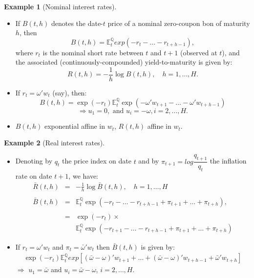 \documentclass[
  12pt,
]{book}
\providecommand{\tightlist}{%
  \setlength{\itemsep}{0pt}\setlength{\parskip}{0pt}}
\theoremstyle{definition}
\theoremstyle{definition}
\newtheorem{example}{Example}[chapter]
\theoremstyle{definition}
\theoremstyle{definition}
\theoremstyle{remark}
\begin{document}
\begin{example}[Nominal interest rates]
\protect\hypertarget{exm:nominalBth}{}\label{exm:nominalBth}\leavevmode

\begin{itemize}
\tightlist
\item
  If \(B(t,h)\) denotes the date-\(t\) price of a nominal zero-coupon bon of maturity \(h\), then
  \begin{equation}
  B(t,h) = \mathbb{E}^{\mathbb{Q}}_t exp (-r_{t}-\dots-r_{t+h-1}),\label{eq:stdbond}
  \end{equation}
  where \(r_{t}\) is the nominal short rate between \(t\) and \(t+1\) (observed at \(t\)), and the associated (continuously-compounded) yield-to-maturity is given by:
  \begin{equation}
  R(t,h) = -  \frac{1}{h}   \log   B(t,h), \quad   h=1,\dots,H.
  \end{equation}
\item
  If \(r_t = \omega'w_t\) (say), then:
  \[
  B(t,h) = \exp(-r_{t}) \mathbb{E}^{\mathbb{Q}}_t \exp(-\omega' w_{t+1} - \dots - \omega' w_{t+h-1})
  \]
  \[
  \Rightarrow u_1 = 0,\mbox{ and } u_i = - \omega, i = 2,\dots, H.
  \]
\item
  \(B(t,h)\) exponential affine in \(w_t\), \(R(t,h)\) affine in \(w_t\).
\end{itemize}

\end{example}

\begin{example}[Real interest rates]
\protect\hypertarget{exm:realBth}{}\label{exm:realBth}\leavevmode

\begin{itemize}
\tightlist
\item
  Denoting by \(q_t\) the price index on date \(t\) and by \(\pi_{t+1} = log \dfrac{q_{t+1}}{q_t}\) the inflation rate on date \(t+1\), we have:
  \begin{eqnarray*}
  \bar{R}(t,h) & =& -   \frac{1}{h}   \log   \bar{B}(t,h), \quad h=1,\dots,H \\    \\
  \bar{B}(t,h) & =&  \mathbb{E}^{\mathbb{Q}}_t   \exp(-r_{t}-\dots-r_{t+h-1} + \pi_{t+1}+\dots+\pi_{t+h}),  \\      \\
  & =& \exp(-r_{t}) \times \\
  && \mathbb{E}^{\mathbb{Q}}_t   \exp(-r_{t+1}-\dots-r_{t+h-1}+\pi_{t+1}+\dots+\pi_{t+h})
  \end{eqnarray*}
\item
  If \(r_t = \omega'w_t\) and \(\pi_t = \bar\omega'w_t\) then \(\bar{B}(t,h)\) is given by:
  \begin{eqnarray*}
  \exp(-r_{t}) \mathbb{E}^{\mathbb{Q}}_t exp[(\bar\omega-\omega)'w_{t+1}+\dots+(\bar\omega-\omega)'w_{t+h-1}+\bar\omega'
  w_{t+h}]
  \end{eqnarray*}
  \(\Rightarrow\) \(u_1 = \bar\omega\) and \(u_i = \bar\omega-\omega\), \(i=2,\dots,H\).
\end{itemize}

\end{example}
\end{document}
